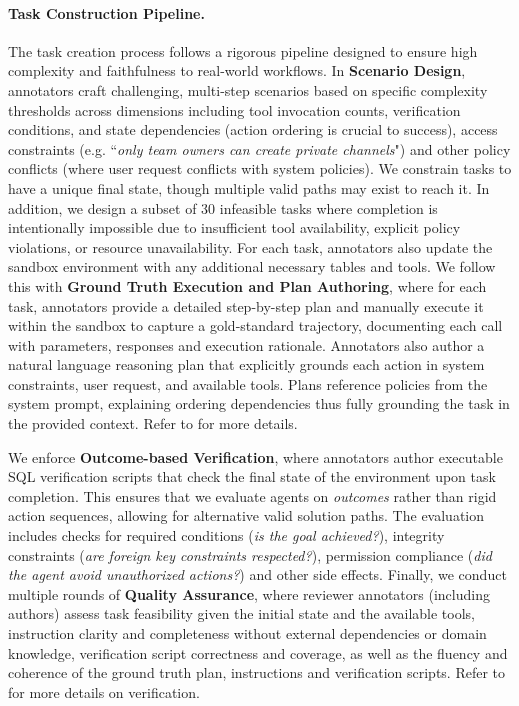 \paragraph{Task Construction Pipeline.}
The task creation process follows a rigorous pipeline designed to ensure high complexity and faithfulness to real-world workflows. In \textbf{Scenario Design}, annotators craft challenging, multi-step scenarios based on specific complexity thresholds across dimensions including tool invocation counts, verification conditions, and state dependencies (action ordering is crucial to success), access constraints (e.g. ``\textit{only team owners can create private channels}") and other policy conflicts (where user request conflicts with system policies). We constrain tasks to have a unique final state, though multiple valid paths may exist to reach it. In addition, we design a subset of 30 infeasible tasks where completion is intentionally impossible due to insufficient tool availability, explicit policy violations, or resource unavailability. For each task, annotators also update the sandbox environment with any additional necessary tables and tools. We follow this with \textbf{Ground Truth Execution and Plan Authoring}, where for each task, annotators provide a detailed step-by-step plan and manually execute it within the sandbox to capture a gold-standard trajectory, documenting each call with parameters, responses and execution rationale. Annotators also author a natural language reasoning plan that explicitly grounds each action in system constraints, user request, and available tools. Plans reference policies from the system prompt, explaining ordering dependencies thus fully grounding the task in the provided context. Refer to  for more details.

We enforce \textbf{Outcome-based Verification}, where annotators author executable SQL verification scripts that check the final state of the environment upon task completion. This ensures that we evaluate agents on \emph{outcomes} rather than rigid action sequences, allowing for alternative valid solution paths. The evaluation includes checks for required conditions (\emph{is the goal achieved?}), integrity constraints (\emph{are foreign key constraints respected?}), permission compliance (\emph{did the agent avoid unauthorized actions?}) and other side effects.  Finally, we conduct multiple rounds of \textbf{Quality Assurance}, where reviewer annotators (including authors) assess task feasibility given the initial state and the available tools,  instruction clarity and completeness without external dependencies or domain knowledge, verification script correctness and coverage, as well as the fluency and coherence of the ground truth plan, instructions and verification scripts. Refer to  for more details on verification.

